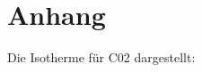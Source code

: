 \section{Anhang}
\label{sec:Anhang}

    \color{blue}{HIER NOCH RECHNUNG UND HERLEITUNG REIN}
    Die Isotherme für C02 dargestellt:
	